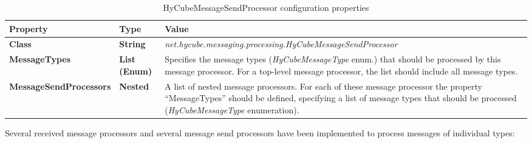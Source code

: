 \begin{table}
\scriptsize
\begin{center}
\begin{tabular}{p{4cm} p{2.0cm} p{9.5cm}}
	\hline
	\textbf{Property}						& \textbf{Type}					& \textbf{Value}					\\[1mm]
    \hline
	\textbf{Class}							& \textbf{String}				& \textit{net.hycube.messaging.processing.HyCubeMessageSendProcessor}									\\[1.5mm]	
	\textbf{MessageTypes}					& \textbf{List (Enum)}			& Specifies the message types (\emph{HyCubeMessageType} enum.) that should be processed by this message processor. For a top-level message processor, the list should include all message types.					\\[1.5mm]	
	\textbf{MessageSendProcessors}			& \textbf{Nested}				& A list of nested message processors. For each of these message processor the property ``MessageTypes'' should be defined, specifying a list of message types that should be processed (\emph{HyCubeMessageType} enumeration).					\\[1.5mm]	
    \hline
\end{tabular}
\end{center}
\caption{HyCubeMessageSendProcessor configuration properties}
\label{tab:libHyCubeMessageSendProcessor}
\end{table}

Several received message processors and several message send processors have been implemented to process messages of individual types:

